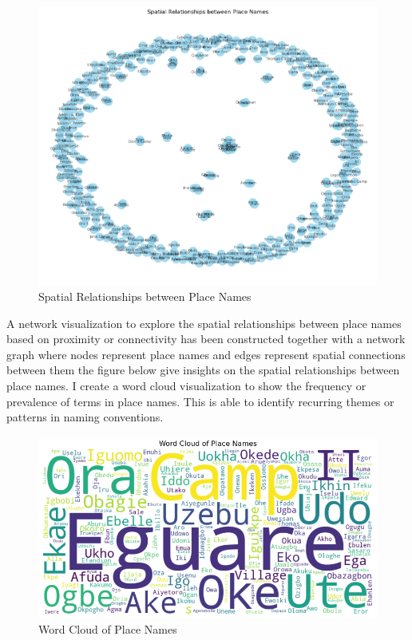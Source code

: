 \begin{figure}
    \centering
    \includegraphics[width=1\linewidth]{networkanalysis.png}
    \caption{Spatial Relationships between Place Names}
    \label{fig:network}
\end{figure}
A network visualization to explore the spatial relationships between place names based on proximity or connectivity has been constructed together with a network graph where nodes represent place names and edges represent spatial connections between them the figure below give insights on the spatial relationships between place names.
\newpage
I create a word cloud visualization to show the frequency or prevalence of terms in place names. This is able to identify recurring themes or patterns in naming conventions.
\begin{figure}
    \centering
    \includegraphics[width=1\linewidth]{wordcloud.png}
    \caption{Word Cloud of Place Names}
    \label{fig:wordcloud}
\end{figure}


